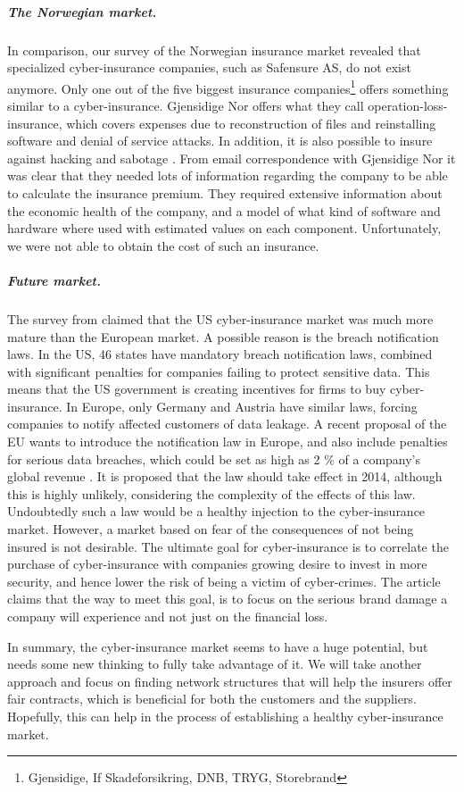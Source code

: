 \subparagraph{The Norwegian market.}

In comparison, our survey of the Norwegian insurance market revealed that specialized cyber-insurance companies, such as Safensure AS, do not exist anymore. Only one out of the five biggest insurance companies\footnote{Gjensidige, If Skadeforsikring, DNB, TRYG, Storebrand} offers something similar to a cyber-insurance. Gjensidige Nor offers what they call operation-loss-insurance, which covers expenses due to reconstruction of files and reinstalling software and denial of service attacks. In addition, it is also possible to insure against hacking and sabotage \citep{gjensidige}. From email correspondence with Gjensidige Nor it was clear that they needed lots of information regarding the company to be able to calculate the insurance premium. They required extensive information about the economic health of the company, and a model of what kind of software and hardware where used with estimated values on each component. Unfortunately, we were not able to obtain the cost of such an insurance.
  
\subparagraph{Future market.}
The survey from \cite{CFCunder} claimed that the US cyber-insurance market was much more mature than the European market. A possible reason is the breach notification laws. In the US, 46 states have mandatory breach notification laws, combined with significant penalties for companies failing to protect sensitive data. This means that the US government is creating incentives for firms to buy cyber-insurance.
 In Europe, only Germany and Austria have similar laws, forcing companies to notify affected customers of data leakage. A recent proposal of the EU wants to introduce the notification law in Europe, and also include penalties for serious data breaches, which could be set as high as 2 $\%$ of a company's global revenue \cite{CFCunder}. It is proposed that the law should take effect in 2014, although this is highly unlikely, considering the complexity of the effects of this law. Undoubtedly such a law would be a healthy injection to the cyber-insurance market. However, a market based on fear of the consequences of not being insured is not desirable. The ultimate goal for cyber-insurance is to correlate the purchase of cyber-insurance with companies growing desire to invest in more security, and hence lower the risk of being a victim of cyber-crimes. 
The article claims that the way to meet this goal, is to focus on the serious brand damage a company will experience and not just on the financial loss. 

In summary, the cyber-insurance market seems to have a huge potential, but needs some new thinking to fully take advantage of it. We will take another approach and focus on finding network structures that will help the insurers offer fair contracts, which is beneficial for both the customers and the suppliers. Hopefully, this can help in the process of establishing a healthy cyber-insurance market.

   
   
   
   
   
   
   
  

